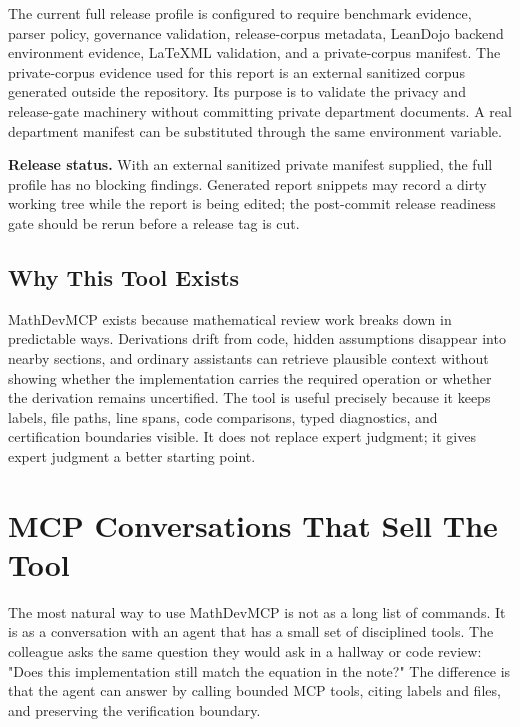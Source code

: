 \documentclass[12pt,a4paper,openany]{book}
\begin{document}
The current full release profile is configured to require benchmark evidence,
parser policy, governance validation, release-corpus metadata, LeanDojo backend
environment evidence, LaTeXML validation, and a private-corpus manifest. The
private-corpus evidence used for this report is an external sanitized corpus
generated outside the repository. Its purpose is to validate the privacy and
release-gate machinery without committing private department documents. A real
department manifest can be substituted through the same environment variable.

\begin{proposalbox}
\textbf{Release status.} With an external sanitized private manifest supplied,
the full profile has no blocking findings. Generated report snippets may record
a dirty working tree while the report is being edited; the post-commit release
readiness gate should be rerun before a release tag is cut.
\end{proposalbox}

\section{Why This Tool Exists}

MathDevMCP exists because mathematical review work breaks down in predictable
ways. Derivations drift from code, hidden assumptions disappear into nearby
sections, and ordinary assistants can retrieve plausible context without showing
whether the implementation carries the required operation or whether the
derivation remains uncertified. The tool is useful precisely because it keeps
labels, file paths, line spans, code comparisons, typed diagnostics, and
certification boundaries visible. It does not replace expert judgment; it gives
expert judgment a better starting point.

\chapter{MCP Conversations That Sell The Tool}

The most natural way to use MathDevMCP is not as a long list of commands. It is
as a conversation with an agent that has a small set of disciplined tools. The
colleague asks the same question they would ask in a hallway or code review:
"Does this implementation still match the equation in the note?" The difference
is that the agent can answer by calling bounded MCP tools, citing labels and
files, and preserving the verification boundary.
\end{document}
